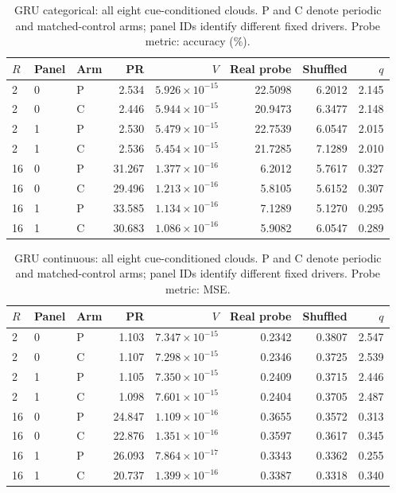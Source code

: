 \begin{table}[htbp]
\centering\footnotesize
\caption{GRU categorical: all eight cue-conditioned clouds. P and C denote periodic and matched-control arms; panel IDs identify different fixed drivers. Probe metric: accuracy (\%).}
\label{tab:cloud-gru-categorical}
\begin{tabular}{lllrrrrr}
\toprule
$R$ & Panel & Arm & PR & $V$ & Real probe & Shuffled & $q$ \\
\midrule
2 & 0 & P & 2.534 & $5.926\!\times\!10^{-15}$ & 22.5098 & 6.2012 & 2.145 \\
2 & 0 & C & 2.446 & $5.944\!\times\!10^{-15}$ & 20.9473 & 6.3477 & 2.148 \\
2 & 1 & P & 2.530 & $5.479\!\times\!10^{-15}$ & 22.7539 & 6.0547 & 2.015 \\
2 & 1 & C & 2.536 & $5.454\!\times\!10^{-15}$ & 21.7285 & 7.1289 & 2.010 \\
16 & 0 & P & 31.267 & $1.377\!\times\!10^{-16}$ & 6.2012 & 5.7617 & 0.327 \\
16 & 0 & C & 29.496 & $1.213\!\times\!10^{-16}$ & 5.8105 & 5.6152 & 0.307 \\
16 & 1 & P & 33.585 & $1.134\!\times\!10^{-16}$ & 7.1289 & 5.1270 & 0.295 \\
16 & 1 & C & 30.683 & $1.086\!\times\!10^{-16}$ & 5.9082 & 6.0547 & 0.289 \\
\bottomrule
\end{tabular}
\end{table}

\begin{table}[htbp]
\centering\footnotesize
\caption{GRU continuous: all eight cue-conditioned clouds. P and C denote periodic and matched-control arms; panel IDs identify different fixed drivers. Probe metric: MSE.}
\label{tab:cloud-gru-continuous}
\begin{tabular}{lllrrrrr}
\toprule
$R$ & Panel & Arm & PR & $V$ & Real probe & Shuffled & $q$ \\
\midrule
2 & 0 & P & 1.103 & $7.347\!\times\!10^{-15}$ & 0.2342 & 0.3807 & 2.547 \\
2 & 0 & C & 1.107 & $7.298\!\times\!10^{-15}$ & 0.2346 & 0.3725 & 2.539 \\
2 & 1 & P & 1.105 & $7.350\!\times\!10^{-15}$ & 0.2409 & 0.3715 & 2.446 \\
2 & 1 & C & 1.098 & $7.601\!\times\!10^{-15}$ & 0.2404 & 0.3705 & 2.487 \\
16 & 0 & P & 24.847 & $1.109\!\times\!10^{-16}$ & 0.3655 & 0.3572 & 0.313 \\
16 & 0 & C & 22.876 & $1.351\!\times\!10^{-16}$ & 0.3597 & 0.3617 & 0.345 \\
16 & 1 & P & 26.093 & $7.864\!\times\!10^{-17}$ & 0.3343 & 0.3362 & 0.255 \\
16 & 1 & C & 20.737 & $1.399\!\times\!10^{-16}$ & 0.3387 & 0.3318 & 0.340 \\
\bottomrule
\end{tabular}
\end{table}

